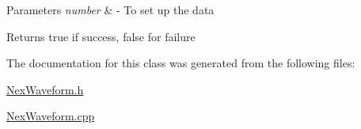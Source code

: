 \begin{DoxyParams}{Parameters}
{\em number} & -\/ To set up the data \\
\hline
\end{DoxyParams}
\begin{DoxyReturn}{Returns}
true if success, false for failure 
\end{DoxyReturn}


The documentation for this class was generated from the following files\+:\begin{DoxyCompactItemize}
\item 
\hyperlink{_nex_waveform_8h}{Nex\+Waveform.\+h}\item 
\hyperlink{_nex_waveform_8cpp}{Nex\+Waveform.\+cpp}\end{DoxyCompactItemize}
